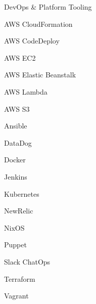 \begin{skillset}{DevOps \& Platform Tooling}
  \item AWS CloudFormation
  \item AWS CodeDeploy
  \item AWS EC2
  \item AWS Elastic Beanstalk
  \item AWS Lambda
  \item AWS S3
  \item Ansible
  \item DataDog
  \item Docker
  \item Jenkins
  \item Kubernetes
  \item NewRelic
  \item NixOS
  \item Puppet
  \item Slack ChatOps
  \item Terraform
  \item Vagrant
\end{skillset}
